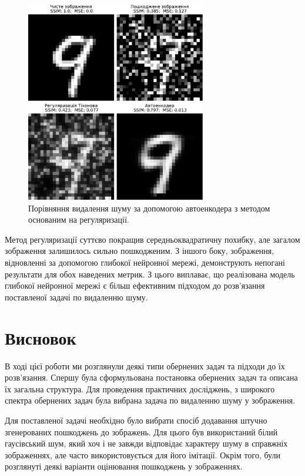 \documentclass[14pt,a4paper]{extarticle}
\newcounter{e}
\numberwithin{equation}{section}
\numberwithin{figure}{section}
\begin{document}
	\begin{figure}[H]
		\centering
		\includegraphics[width=0.7\textwidth]{../resources/denoising-methods-comparation.pdf}
		\caption{Порівняння видалення шуму за допомогою автоенкодера з методом основаним на регуляризації.}
		\label{fig:denoising-methods-comparation}
	\end{figure}

	Метод регуляризації суттєво покращив середньоквадратичну похибку, але загалом зображення залишилось сильно пошкодженим. З іншого боку, зображення, відновленні за допомогою глибокої нейронної мережі, демонструють непогані результати для обох наведених метрик. З цього виплаває, що реалізована модель глибокої нейронної мережі є більш ефективним підходом до розв'язання поставленої задачі по видаленню шуму.

	\newpage
	\thispagestyle{empty}
	\section*{Висновок}
	\begin{center}\end{center}
	В ході цієї роботи ми розглянули деякі типи обернених задач та підходи до їх розв'язання. Спершу була сформульована постановка обернених задач та описана їх загальна структура. Для проведення практичних досліджень, з широкого спектра обернених задач була вибрана задача по видаленню шуму у зображення.
	
	Для поставленої задачі необхідно було вибрати спосіб додавання штучно згенерованих пошкоджень до зображень. Для цього був використаний білий гаусівський шум, який хоч і не завжди відповідає характеру шуму в справжніх зображеннях, але часто використовується для його імітації. Окрім того, були розглянуті деякі варіанти оцінювання пошкоджень у зображеннях.
	
\end{document}

